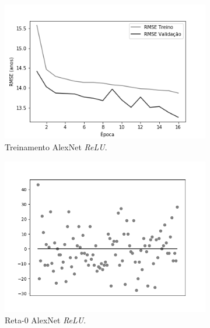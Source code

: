 	\begin{figure}[ht!]
		\caption{Resultados do treinamento e teste da CNN AlexNet de acordo com a Abordagem 2.}\label{fig:alexnet-abordagem2}
		\begin{subfigure}[hb]{0.5\linewidth}
			\caption{Treinamento AlexNet \emph{ReLU}.}
			\includegraphics[width=\linewidth]{img/graficos/history/alexnet/fig-history-image-treat-2-alexnet-relu-rmse.png}
		\end{subfigure}
		\begin{subfigure}[hb]{0.5\linewidth}
			\caption{Reta-0 AlexNet \emph{ReLU}.}
			\includegraphics[width=\linewidth]{img/graficos/reta0/alexnet/fig-reta-0-image-treat-2-alexnet-relu.png}%
		\end{subfigure}\\
		\begin{subfigure}[hb]{0.5\linewidth}

\end{subfigure}
\end{figure}
